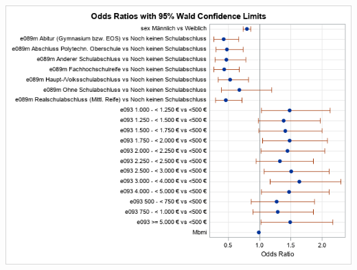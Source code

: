 \documentclass[
  10pt,
]{article}
\begin{document}
\includegraphics[width=8.89in]{./Yimeng_Plots/M7_3}
\end{document}
